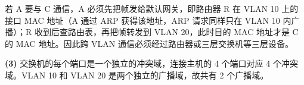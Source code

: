 \begin{enumerate}
若 A 要与 C 通信，A 必须先把帧发给默认网关，即路由器 R 在 VLAN 10 上的接口 MAC 地址（A 通过 ARP 获得该地址，ARP 请求同样只在 VLAN 10 内广播）；R 收到后查路由表，再把帧转发到 VLAN 20，此时目的 MAC 地址才是 C 的 MAC 地址。因此跨 VLAN 通信必须经过路由器或三层交换机等三层设备。

\textbf{(3)} 交换机的每个端口是一个独立的冲突域，连接主机的 4 个端口对应 4 个冲突域。VLAN 10 和 VLAN 20 是两个独立的广播域，故共有 2 个广播域。

\begin{center}
\end{center}\else \answerarea[10] \fi

\end{enumerate}
